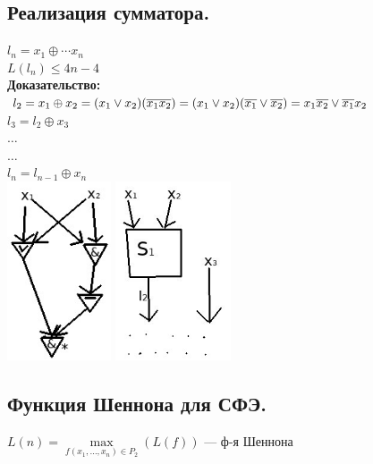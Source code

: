 \documentclass[12pt]{article}
\begin{document}
\subsection{Реализация сумматора.}
	$l_n = x_1 \oplus \dotsb x_n$\\
	$L(l_n) \leqslant 4n - 4$\\
	\textbf{Доказательство:}\\
	$l_2 = x_1 \oplus x_2 = (x_1 \vee x_2)(\overline{x_1x_2}) \*= (x_1 \vee x_2)(\overline{x_1} \vee \overline{x_2}) \*= x_1\overline{x_2} \vee \overline{x_1}x_2$\\
	$l_3 = l_2 \oplus x_3$\\
	$\dotsc$\\
	$\dotsc$\\
	$l_n = l_{n-1} \oplus x_n$\\
	\includegraphics[height=150pt]{27} \quad\quad\quad\quad\quad\quad\quad\quad\quad\quad\quad\quad \includegraphics[height=150pt]{28}\\
\subsection{Функция Шеннона для СФЭ.}
	$L(n) = \underset{f(x_1,\dotsc,x_n) \in P_2}{\max}(L(f))$ — ф-я Шеннона
\end{document}
